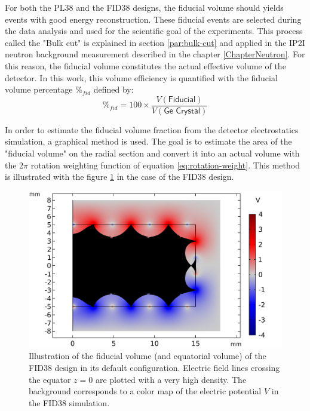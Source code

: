 For both the PL38 and the FID38 designs, the fiducial volume should yields events with good energy reconstruction. These fiducial events are selected during the data analysis and used for the scientific goal of the experiments. This process called the "Bulk cut" is explained in section \ref{par:bulk-cut} and applied in the IP2I neutron background measurement described in the chapter \ref{ChapterNeutron}. For this reason, the fiducial volume constitutes the actual effective volume of the detector. In this work, this volume efficiency is quantified with the fiducial volume percentage $\%_{fid}$ defined by:
\begin{equation}
\label{eq:theoretical-fiducial-volume}
\%_{fid} = 100 \times \frac{V(\textsf{Fiducial})}{V(\textsf{Ge Crystal})}
\end{equation} 
 
In order to estimate the fiducial volume fraction from the detector electrostatics simulation, a graphical method is used. The goal is to estimate the area of the "fiducial volume" on the radial section and convert it into an actual volume with the $2\pi$ rotation weighting function of equation \ref{eq:rotation-weight}. This method is illustrated with the figure \ref{fig:fid38-fiducial} in the case of the FID38 design. 

\begin{figure}
\centering
\includegraphics[scale=0.5]{Figures/Electrodes/fid38_fiducial_streamlines.png}
\caption{Illustration of the fiducial volume (and equatorial volume) of the FID38 design in its default configuration. Electric field lines crossing the equator $z=0$ are plotted with a very high density. The background corresponds to a color map of the electric potential $V$ in the FID38 simulation.}
\label{fig:fid38-fiducial}
\end{figure}

